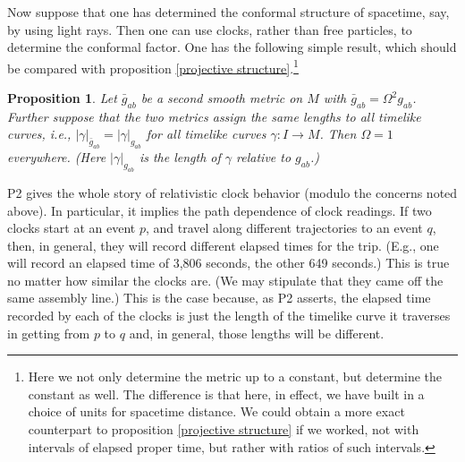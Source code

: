 \documentclass [12] {article}
\theoremstyle{plain}
\newtheorem{proposition}{Proposition}[subsection]
\numberwithin{figure}{subsection}
\numberwithin{proposition}{subsection}
\begin{document}
Now suppose that one has determined the conformal structure of spacetime, say, by using light rays. Then one can use clocks, rather than free particles, to determine the conformal factor.  One has the following simple result, which should  be compared with proposition \ref{projective structure}.\footnote{Here we not  only determine the metric up  to a constant, but determine the constant as well. 
The  difference is that here, in effect, we have built in a choice of units for spacetime distance.  We could obtain a more exact counterpart to proposition \ref{projective structure} if we worked, not with intervals of elapsed proper time,  but rather with ratios of such intervals. 
}

\begin{proposition} \label{clocks} 
Let $\bar{g}_{ab}$ be a second smooth metric on $M$ with $\bar{g}_{ab} = \Omega^2 g_{ab}$. Further suppose that the two metrics assign the same lengths to all timelike curves, i.e.,  $|\gamma|_{\bar{g}_{ab}} =  |\gamma|_{g_{ab}}$ for all timelike curves $\gamma: I \rightarrow M $. Then $\Omega = 1 $ everywhere.
(Here $|\gamma|_{g_{ab}}$  is the length of $\gamma$ relative to $g_{ab}$.)
\end{proposition}


P2    gives  the whole story of relativistic clock behavior (modulo the concerns noted above).  In particular, it implies the path dependence of clock readings.   %
If two clocks start at an event $p$, and travel along different trajectories to an event $q$, then, in general, they will record different elapsed times for the trip. (E.g., one will record an elapsed time of 3,806 seconds, the other 649 seconds.) This is true no matter how similar the clocks are. (We may stipulate that they came off the same assembly line.)  This is the case because, as P2 asserts,  the elapsed time recorded by each of the clocks is  just the length of the timelike curve it traverses in getting from $p$ to $q$ and, in general, those lengths will be different.
	
\end{document}
